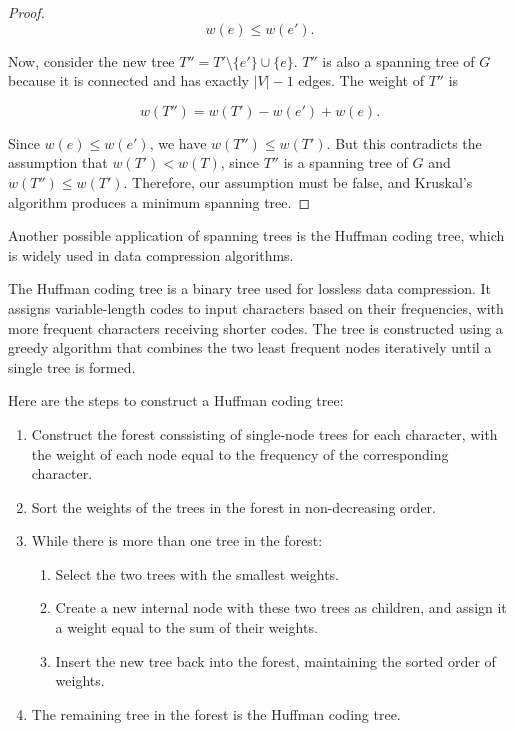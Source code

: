 \begin{proof}
\[w(e) \leq w(e').\]

Now, consider the new tree $T'' = T' \setminus \{e' \} \cup \{e\}$. $T''$ is also a spanning tree of $G$ because it is connected and has exactly $|V|-1$ edges. The weight of $T''$ is

\[w(T'') = w(T') - w(e') + w(e).\]

Since $w(e) \leq w(e')$, we have $w(T'') \leq w(T')$. But this contradicts the assumption that $w(T') < w(T)$, since $T''$ is a spanning tree of $G$ and $w(T'') \leq w(T')$. Therefore, our assumption must be false, and Kruskal's algorithm produces a minimum spanning tree.

\end{proof}

Another possible application of spanning trees is the Huffman coding tree, which is widely used in data compression algorithms.

The Huffman coding tree is a binary tree used for lossless data compression. It assigns variable-length codes to input characters based on their frequencies, with more frequent characters receiving shorter codes. The tree is constructed using a greedy algorithm that combines the two least frequent nodes iteratively until a single tree is formed.

Here are the steps to construct a Huffman coding tree:
\begin{enumerate}
    \item Construct the forest conssisting of single-node trees for each character, with the weight of each node equal to the frequency of the corresponding character.
    \item Sort the weights of the trees in the forest in non-decreasing order.
    \item While there is more than one tree in the forest:
    \begin{enumerate}
        \item Select the two trees with the smallest weights.
        \item Create a new internal node with these two trees as children, and assign it a weight equal to the sum of their weights.
        \item Insert the new tree back into the forest, maintaining the sorted order of weights.
    \end{enumerate}
    \item The remaining tree in the forest is the Huffman coding tree.
\end{enumerate}

